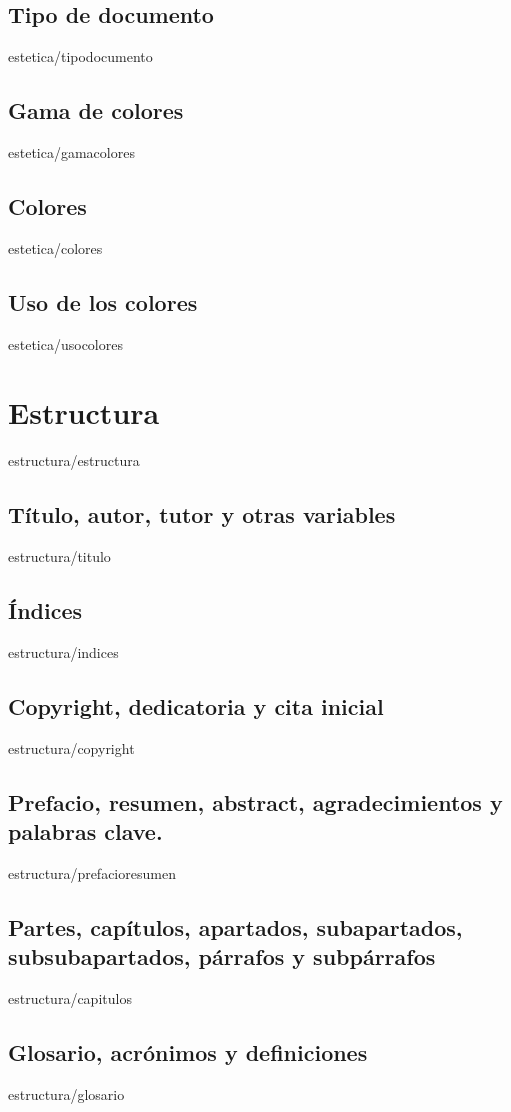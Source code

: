 \documentclass[epsbased,copyright,final,printable,covers,extendedindex,firstnumbered,tfg,gnuplot]{tfgtfmthesisuam}
\begin{document}
  \section{Tipo de documento\label{SEC:TIPODOC}}{estetica/tipodocumento}
  \section{Gama de colores\label{SEC:GAMASEL}}{estetica/gamacolores}
  \section{Colores\label{SEC:COLORES}}{estetica/colores}
  \section{Uso de los colores\label{SEC:USOCOLORES}}{estetica/usocolores}

\chapter{Estructura\label{CAP:ESTRUCTURA}}{estructura/estructura}
  \section{Título, autor, tutor y otras variables\label{SEC:VARIABLES}}{estructura/titulo}
  \section{Índices\label{SEC:INDICES}}{estructura/indices}
  \section{Copyright, dedicatoria y cita inicial\label{SEC:COPYRIGHT}}{estructura/copyright}
  \section[Prefacio, resumen ...]{Prefacio, resumen, abstract, agradecimientos y palabras clave.\label{SEC:PREFACIO}}{estructura/prefacioresumen}
  \section[Partes, capítulos ...]{Partes, capítulos, apartados, subapartados, subsubapartados, párrafos y subpárrafos\label{SEC:CAPITULOS}}{estructura/capitulos}
  \section[Glosario, acrónimos y definiciones]{Glosario, acrónimos y definiciones\label{SEC:GLOSARIO}}{estructura/glosario}
\end{document}
